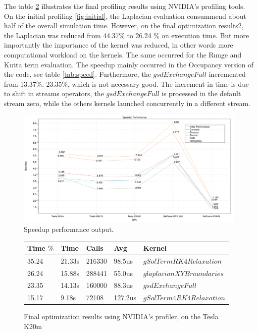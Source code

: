 The table \ref{fig:final} illustrates the final profiling results using NVIDIA's profiling tools. On the initial profiling \ref{fig:initial}, the Laplacian evaluation consummend about half of the overall simulation time. However, on the final optimization results\ref{fig:final}, the Laplacian was reduced from 44.37$\%$ to 26.24 $\%$ on execution time. But more importantly the importance of the kernel was reduced, in other words more computational workload on the kernels. The same occurred for the Runge and Kutta term evaluation. The speedup mainly occurred in the Occupancy version of the code, see table \ref{tab:speed}. Furthermore, the $gsdExchangeFull$ incremented from 13.37$\%$. 23.35$\%$, which is not necessary good. The increment in time is due to shift in streams operators, the $gsdExchangeFull$ is processed in the default stream zero, while the others kernels launched concurrently in a different stream.
\begin{figure}[htbp]
	\centering
		\includegraphics[width=1.0 \textwidth]{Figures/speedup.png}
		\smallskip
	\caption[Speedup performance output]{Speedup performance output.}
	\label{fig:speedup}
\end{figure}

\begin{figure}[htbp]
	\centering
	  \begin{tabular} { |  l  |  l | l  | l | l |}
	      \hline
	    Time $\%$& Time & Calls & Avg & Kernel \\
    \hline
   35.24 & 21.33s & 216330 & 98.5us & $gSolTermRK4Relaxation$ \\
   \hline
   26.24 & 15.88s & 288441 & 55.0us & $glaplacianXYBroundaries$\\
   \hline
   23.35 & 14.13s & 160000 & 88.3us & $gsdExchangeFull$ \\
   \hline
   15.17 & 9.18s & 72108 & 127.2us & $gSolTerm4RK4Relaxation$\\ 
   \hline
    \end{tabular}
	\caption[Optimization results with the Profiler]{Final optimization results using NVIDIA's profiler, on the Tesla K20m}
	\label{fig:final}
\end{figure}
    
